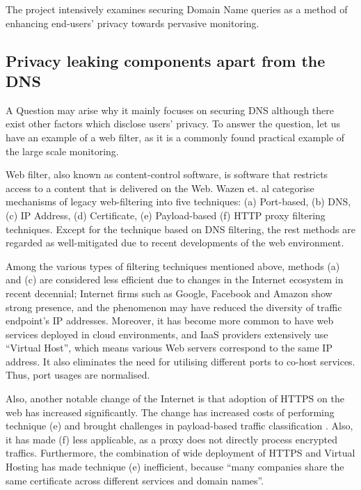 The project intensively examines securing Domain Name queries as a method of enhancing end-users' privacy towards pervasive monitoring.

\subsection{Privacy leaking components apart from the DNS}
A Question may arise why it mainly focuses on securing DNS although there exist other factors which disclose users' privacy.
To answer the question, let us have an example of a web filter, as it is a commonly found practical example of the large scale monitoring\cite{murdoch2008tools}.

Web filter, also known as content-control software, is software that restricts access to a content that is delivered on the Web.
Wazen et. al categorise mechanisms of legacy web-filtering into five techniques: (a) Port-based, (b) DNS, (c) IP Address, (d) Certificate, (e) Payload-based (f) HTTP proxy filtering techniques\cite{shbair2015efficiently}.
Except for the technique based on DNS filtering, the rest methods are regarded as well-mitigated due to recent developments of the web environment. 

Among the various types of filtering techniques mentioned above, methods (a) and (c) are considered less efficient due to changes in the Internet ecosystem in recent decennial;
Internet firms such as Google, Facebook and Amazon show strong presence\cite{haucap2014google}, and the phenomenon may have reduced the diversity of traffic endpoint's IP addresses.
Moreover, it has become more common to have web services deployed in cloud environments\cite{clouds2018stat}, and IaaS providers extensively use ``Virtual Host\cite{virtual24host}'', which means various Web servers correspond to the same IP address.
It also eliminates the need for utilising different ports to co-host services. Thus, port usages are normalised.

Also, another notable change of the Internet is that adoption of HTTPS on the web has increased significantly\cite{felt2017measuring}.
The change has increased costs of performing technique (e) and brought challenges in payload-based traffic classification \cite{xue2013traffic}.
Also, it has made (f) less applicable, as a proxy does not directly process encrypted traffics\cite{shbair2015efficiently}.
Furthermore, the combination of wide deployment of HTTPS and Virtual Hosting has made technique (e) inefficient, because ``many companies share the same certificate across different services and domain names\cite{shbair2015efficiently}''.

